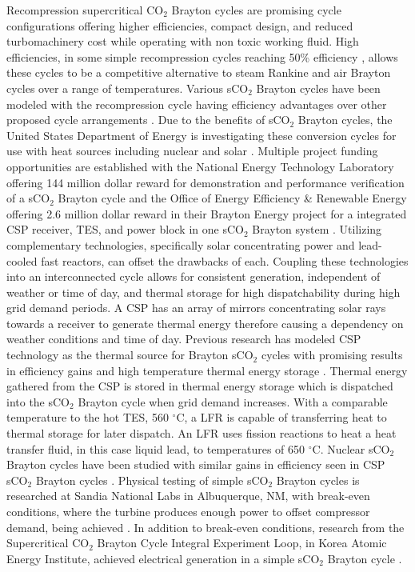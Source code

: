 Recompression supercritical CO$_2$ Brayton cycles are promising cycle configurations offering higher efficiencies, compact design, and reduced turbomachinery cost while operating with non toxic working fluid. High efficiencies, in some simple recompression cycles reaching 50\% efficiency \cite{turchi_2013,wright_2009}, allows these cycles to be a competitive alternative to steam Rankine and air Brayton cycles over a range of temperatures. Various sCO$_2$ Brayton cycles have been modeled with the recompression cycle having efficiency advantages over other proposed cycle arrangements \cite{turchi_2013,ahn_2014,wang_2018}.  Due to the benefits of sCO$_2$ Brayton cycles, the United States Department of Energy is investigating these conversion cycles for use with heat sources including nuclear and solar \cite{doe_2012}. Multiple project funding opportunities are established with the National Energy Technology Laboratory offering 144 million dollar reward for demonstration and performance verification of a sCO$_2$ Brayton cycle \cite{netl_2016} and the Office of Energy Efficiency \& Renewable Energy offering 2.6 million dollar reward in their Brayton Energy project for a integrated CSP receiver, TES, and power block in one sCO$_2$ Brayton system \cite{seto_2015}. Utilizing complementary technologies, specifically solar concentrating power and lead-cooled fast reactors, can offset the drawbacks of each. Coupling these technologies into an interconnected cycle allows for consistent generation, independent of weather or time of day, and thermal storage for high dispatchability during high grid demand periods.
A CSP has an array of mirrors concentrating solar rays towards a receiver to generate thermal energy therefore causing a dependency on weather conditions and time of day. Previous research has modeled CSP technology as the thermal source for Brayton sCO$_2$ cycles with promising results in efficiency gains and high temperature thermal energy storage \cite{turchi_2013, iverson_2013, ho_2015, wang_2018, neises_2020}. Thermal energy gathered from the CSP is stored in thermal energy storage which is dispatched into the sCO$_2$ Brayton cycle when grid demand increases. With a comparable temperature to the hot TES, 560 $^{\circ}$C, a LFR is capable of transferring heat to thermal storage for later dispatch. An LFR uses fission reactions to heat a heat transfer fluid, in this case liquid lead, to temperatures of 650 $^{\circ}$C. Nuclear sCO$_2$ Brayton cycles have been studied with similar gains in efficiency seen in CSP sCO$_2$ Brayton cycles \cite{ dostal_2004, luo_2020}. Physical testing of simple sCO$_2$ Brayton cycles is researched at Sandia National Labs in Albuquerque, NM, with break-even conditions, where the turbine produces enough power to offset compressor demand, being achieved \cite{wright_2011}. In addition to break-even conditions, research from the Supercritical CO$_2$ Brayton Cycle Integral Experiment Loop, in Korea Atomic Energy Institute, achieved electrical generation in a simple sCO$_2$ Brayton cycle \cite{cha_2016}. 

